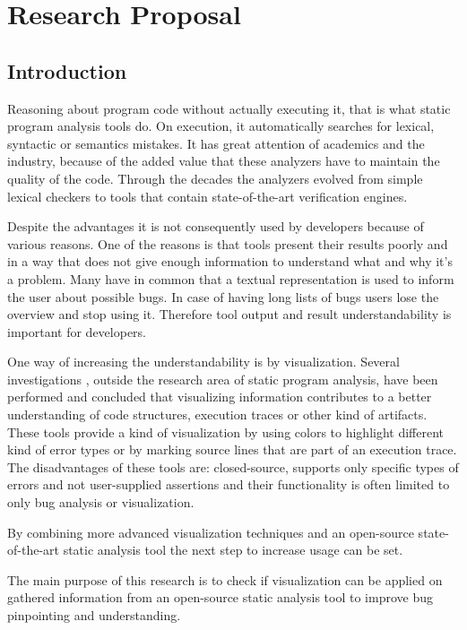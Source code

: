 \chapter{Research Proposal}
\label{chap:Research Proposa}



\section{Introduction}
Reasoning about program code without actually executing it, that is what static program analysis tools do. On execution, it automatically searches for lexical, syntactic or semantics mistakes. It has great attention of academics and the industry, because of the added value that these analyzers have to maintain the quality of the code. Through the decades the analyzers evolved from simple lexical checkers to tools that contain state-of-the-art verification engines. 
\par Despite the advantages it is not consequently used by developers because of various reasons. One of the reasons is that tools present their results poorly and in a way that does not give enough information to understand what and why it's a problem. Many have in common that a textual representation is used to inform the user about possible bugs. In case of having long lists of bugs users lose the overview and stop using it. Therefore tool output and result understandability is important for developers.
\par One way of increasing the understandability is by visualization. Several investigations , outside the research area of static program analysis, have been performed and concluded that visualizing information contributes to a better understanding of code structures, execution traces or other kind of artifacts. These tools provide a kind of visualization by using colors to highlight different kind of error types or by marking source lines that are part of an execution trace. The disadvantages of these tools are: closed-source, supports only specific types of errors and not user-supplied assertions and their functionality is often limited to only bug analysis or visualization.  
\par By combining more advanced visualization techniques and an open-source state-of-the-art static analysis tool the next step to increase usage can be set. 
\par The main purpose of this research is to check if visualization can be applied on gathered information from an open-source static analysis tool to improve bug pinpointing and understanding.

